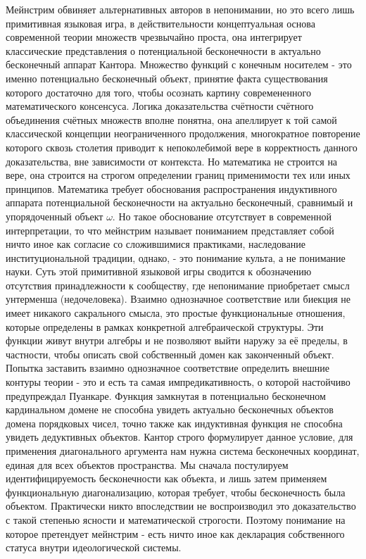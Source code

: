 \documentclass[12pt]{article}
\begin{document}
Мейнстрим обвиняет альтернативных авторов в непонимании, но это всего лишь примитивная языковая игра, в действительности концептуальная основа современной теории множеств чрезвычайно проста, она интегрирует классические представления о потенциальной бесконечности в актуально бесконечный аппарат Кантора. Множество функций с конечным носителем - это именно потенциально бесконечный объект, принятие факта существования которого достаточно для того, чтобы осознать картину современенного математического консенсуса. Логика доказательства счётности счётного объединения счётных множеств вполне понятна, она апеллирует к той самой классической концепции неограниченного продолжения, многократное повторение которого сквозь столетия приводит к непоколебимой вере в корректность данного доказательства, вне зависимости от контекста. Но математика не строится на вере, она строится на строгом определении границ применимости тех или иных принципов. Математика требует обоснования распространения индуктивного аппарата потенциальной бесконечности на актуально бесконечный, сравнимый и упорядоченный объект $\omega$. Но такое обоснование отсутствует в современной интерпретации, то что мейнстрим называет пониманием представляет собой ничто иное как согласие со сложившимися практиками, наследование институциональной традиции, однако, - это понимание культа, а не понимание науки. Суть этой примитивной языковой игры сводится к обозначению отсутствия принадлежности к сообществу, где непонимание приобретает смысл унтерменша (недочеловека). Взаимно однозначное соответствие или биекция не имеет никакого сакрального смысла, это простые функциональные отношения, которые определены в рамках конкретной алгебраической структуры. Эти функции живут внутри алгебры и не позволяют выйти наружу за её пределы, в частности, чтобы описать свой собственный домен как законченный объект. Попытка заставить взаимно однозначное соответствие определить внешние контуры теории - это и есть та самая импредикативность, о которой настойчиво предупреждал Пуанкаре. Функция замкнутая в потенциально бесконечном кардинальном домене не способна увидеть актуально бесконечных объектов домена порядковых чисел, точно также как индуктивная функция не способна увидеть дедуктивных объектов. Кантор строго формулирует данное условие, для применения диагонального аргумента нам нужна система бесконечных координат, единая для всех объектов пространства. Мы сначала постулируем идентифицируемость бесконечности как объекта, и лишь затем применяем функциональную диагонализацию, которая требует, чтобы бесконечность была объектом. Практически никто впоследствии не воспроизводил это доказательство с такой степенью ясности и математической строгости. Поэтому понимание на которое претендует мейнстрим - есть ничто иное как декларация собственного статуса внутри идеологической системы.
\end{document}
